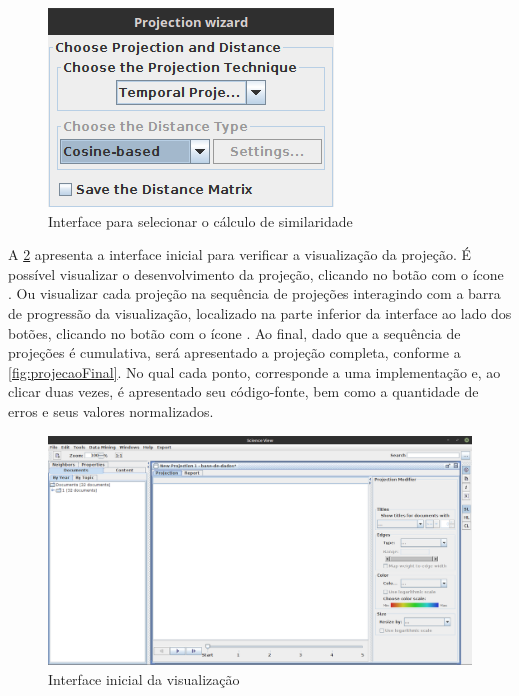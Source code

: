		\begin{figure}
			\centering
			\includegraphics[width=0.5\linewidth]{imagem/similaridade}
			\caption{Interface para selecionar o cálculo de similaridade}
			\label{fig:similaridade}
		\end{figure}
		
		
		A \cref{fig:projecao} apresenta a interface inicial para verificar a visualização da
		projeção. É possível visualizar o desenvolvimento da projeção, clicando no botão
		com o ícone . Ou visualizar cada projeção na sequência de projeções
		interagindo com a barra de progressão da visualização, localizado na parte inferior
		da interface ao lado dos botões, clicando no botão com o ícone .
		Ao final, dado que a sequência de projeções é cumulativa, será apresentado a projeção
		completa, conforme a \cref{fig:projecaoFinal}. No qual cada ponto, corresponde a uma
		implementação e, ao clicar duas vezes, é apresentado seu código-fonte, bem como a
		quantidade de erros e seus valores normalizados.
		
		\begin{figure}
			\centering
			\includegraphics[width=0.8\linewidth]{imagem/projecao}
			\caption{Interface inicial da visualização}
			\label{fig:projecao}
		\end{figure}
		
